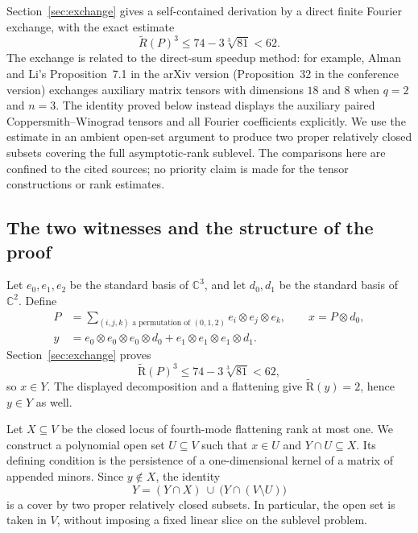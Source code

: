 \documentclass[10pt,a4paper]{article}
\theoremstyle{definition}
\theoremstyle{remark}
\numberwithin{equation}{section}
\newcommand{\C}{\mathbb C}
\newcommand{\AR}{\widetilde{\mathrm R}}
\begin{document}
Section~\ref{sec:exchange} gives a self-contained derivation by a direct
finite Fourier exchange, with the exact estimate
\[
 \widetilde R(P)^3\leq74-3\sqrt[3]{81}<62.
\]
The exchange is related to the direct-sum speedup method: for example,
Alman and Li's Proposition~7.1 in the arXiv version
(Proposition~32 in the conference version) exchanges auxiliary matrix
tensors with dimensions $18$ and $8$ when $q=2$ and $n=3$.
The identity proved below instead displays the auxiliary paired
Coppersmith--Winograd tensors and all Fourier coefficients explicitly.
We use the estimate in an ambient open-set argument to produce two
proper relatively closed subsets covering the full asymptotic-rank
sublevel.  The comparisons here are confined to the cited sources;
no priority claim is made for the tensor constructions or rank
estimates.


\subsection{The two witnesses and the structure of the proof}

Let $e_0,e_1,e_2$ be the standard basis of $\C^3$, and let $d_0,d_1$
be the standard basis of $\C^2$. Define
\begin{equation}\label{eq:Pxy}
 \begin{split}
 P&=\sum_{(i,j,k)\text{ a permutation of }(0,1,2)}
             e_i\otimes e_j\otimes e_k,\qquad x=P\otimes d_0,\\
 y&=e_0\otimes e_0\otimes e_0\otimes d_0
       +e_1\otimes e_1\otimes e_1\otimes d_1.
 \end{split}
\end{equation}
Section~\ref{sec:exchange} proves
\begin{equation}\label{eq:strict-cost}
 \AR(P)^3\leq 74-3\sqrt[3]{81}<62,
\end{equation}
so $x\in Y$. The displayed decomposition and a flattening give
$\AR(y)=2$, hence $y\in Y$ as well.

Let $X\subseteq V$ be the closed locus of fourth-mode flattening rank
at most one. We construct a polynomial open set $U\subseteq V$ such
that $x\in U$ and $Y\cap U\subseteq X$. Its defining condition is
the persistence of a one-dimensional kernel of a matrix of appended
minors. Since $y\notin X$, the identity
\begin{equation}\label{eq:cover-intro}
 Y=(Y\cap X)\ \cup\ \bigl(Y\cap(V\setminus U)\bigr)
\end{equation}
is a cover by two proper relatively closed subsets. In particular,
the open set is taken in $V$, without imposing a fixed linear slice
on the sublevel problem.
\end{document}
